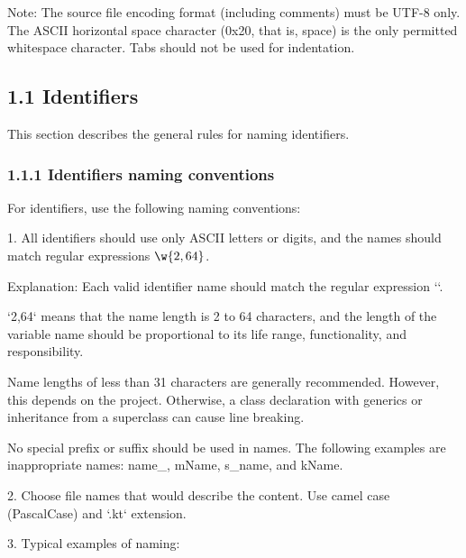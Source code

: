 Note: The source file encoding format (including comments) must be UTF-8 only. The ASCII horizontal space character (0x20, that is, space) is the only permitted whitespace character. Tabs should not be used for indentation.



\subsection*{\textbf{1.1 Identifiers}}

\label{sec:1.1}

This section describes the general rules for naming identifiers.

\subsubsection*{\textbf{1.1.1 Identifiers naming conventions}}
\leavevmode\newline

\label{sec:1.1.1}



For identifiers, use the following naming conventions:

1.	All identifiers should use only ASCII letters or digits, and the names should match regular expressions \textbf{$\w{2,64}$}.

Explanation: Each valid identifier name should match the regular expression ``.

`{2,64}` means that the name length is 2 to 64 characters, and the length of the variable name should be proportional to its life range, functionality, and responsibility.

Name lengths of less than 31 characters are generally recommended. However, this depends on the project. Otherwise, a class declaration with generics or inheritance from a superclass can cause line breaking.

No special prefix or suffix should be used in names. The following examples are inappropriate names: name\_, mName, s\_name, and kName.



2.	Choose file names that would describe the content. Use camel case (PascalCase) and `.kt` extension.



3.	Typical examples of naming:



